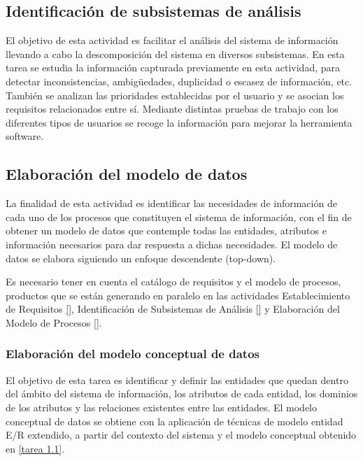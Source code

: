 \documentclass[11pt,a4paper,spanish,twoside]{report}
\begin{document}
\subsection{Identificación de subsistemas de análisis}
El objetivo de esta actividad es facilitar el análisis del sistema de
información llevando a cabo la descomposición del sistema en diversos
subsistemas. 
En esta tarea se estudia la información capturada previamente en esta
actividad, para detectar inconsistencias, ambigüedades, duplicidad o escasez
de información, etc. También se analizan las prioridades establecidas por el
usuario y se asocian los requisitos relacionados entre sí.
Mediante distintas pruebas de trabajo con los diferentes tipos de usuarios
se recoge la información para mejorar la herramienta software.
\subsection{Elaboración del modelo de datos}
La finalidad de esta actividad es identificar las necesidades de información
de cada uno de los procesos que constituyen el sistema de información, con el
fin de obtener un modelo de datos que contemple todas las entidades,
atributos e información necesarios para dar respuesta a dichas necesidades. 
El modelo de datos se elabora siguiendo un enfoque descendente (top-down).

Es necesario tener en cuenta el catálogo de requisitos y el modelo
de procesos, productos que se están generando en paralelo en las actividades
Establecimiento de Requisitos \vref{}, Identificación de Subsistemas de
Análisis \vref{} y Elaboración del Modelo de Procesos \vref{}.

\subsubsection{Elaboración del modelo conceptual de datos}
El objetivo de esta tarea es identificar y definir las entidades que quedan
dentro del ámbito del sistema de información, los atributos de cada entidad,
los dominios de los atributos y las relaciones existentes entre las
entidades. 
El modelo conceptual de datos se obtiene con la aplicación de técnicas de modelo
entidad E/R extendido, a partir del contexto del sistema y el modelo
conceptual obtenido en \vref{tarea 1.1}.
\end{document}
